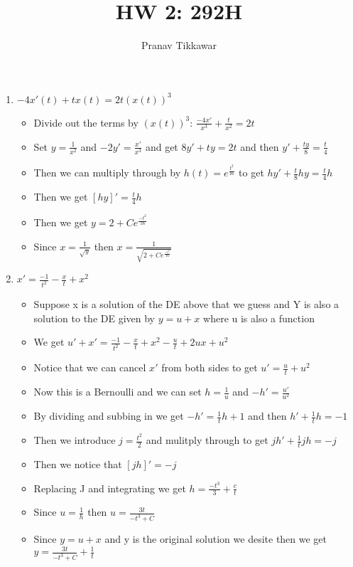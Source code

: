 \documentclass{article}
\author{Pranav Tikkawar}
\title{HW 2: 292H}
\begin{document}
\maketitle
\begin{enumerate}
    \item $-4x'(t)+tx(t) = 2t(x(t))^3 $ \begin{itemize}
        \item Divide out the terms by $(x(t))^3$: $\frac{-4x'}{x^3} + \frac{t}{x^2} = 2t $
        \item Set $y = \frac{1}{x^2} $ and $-2y' = \frac{x'}{x^3} $ and get $8y' +ty = 2t$ and then $y' + \frac{ty}{8} = \frac{t}{4}$
        \item Then we can multiply through by $h(t) = e^{\frac{t^2}{16}}$ to get $hy' + \frac{t}{8}hy = \frac{t}{4}h$
        \item Then we get $[hy]' = \frac{t}{4}h $
        \item Then we get $y = 2 + Ce^{\frac{-t^2}{16}}  $
        \item Since $x = \frac{1}{\sqrt{y}}$ then $x = \frac{1}{\sqrt{2+Ce^{\frac{-t^2}{16}}}} $
    \end{itemize}
    \item $x' =  \frac{-1}{t^2} - \frac{x}{t} + x^2$ \begin{itemize}
        \item Suppose x is a solution of the DE above that we guess and Y is also a solution to the DE given by $y = u + x $ where u is also a function
        \item We get $u' + x' = \frac{-1}{t^2} - \frac{x}{t} + x^2 - \frac{u}{t} + 2ux + u^2 $ 
        \item Notice that we can cancel $ x' $ from both sides to get $u' = \frac{u}{t} + u^2$
        \item Now this is a Bernoulli and we can set $h = \frac{1}{u}$ and $-h' = \frac{u'}{u^2}$ 
        \item By dividing and subbing in we get $-h' = \frac{1}{t}h +1$ and then $h' + \frac{1}{t}h = -1$
        \item Then we introduce $j = \frac{t^2}{2}$ and mulitply through to get $jh'+ \frac{1}{t}jh = -j$
        \item Then we notice that $[jh]' = -j $
        \item Replacing J and integrating we get $ h = \frac{-t^3}{3} + \frac{c}{t} $
        \item Since $u = \frac{1}{h}$ then $u = \frac{3t}{-t^3+C} $
        \item Since $y = u + x $ and y is the original solution we desite then we get $y = \frac{3t}{-t^3+C} +\frac{1}{t} $

\end{itemize}
\end{enumerate}
\end{document}
